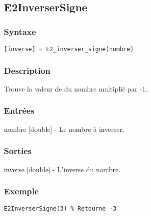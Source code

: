 \begin{minipage}{\linewidth}
\subsection*{E2InverserSigne}
\subsubsection*{Syntaxe}
\begin{lstlisting}
[inverse] = E2_inverser_signe(nombre)
\end{lstlisting}
\subsubsection*{Description}
Trouve la valeur de du nombre multiplié par -1.
\subsubsection*{Entrées}
\begin{description}
\item nombre [double] - Le nombre à inverser. 
\end{description} \subsubsection*{Sorties}
\begin{description}
\item inverse [double] - L'inverse du nombre. 
\end{description} 
\subsubsection*{Exemple}
\begin{lstlisting}
E2InverserSigne(3) % Retourne -3
\end{lstlisting} \medskip
\end{minipage}